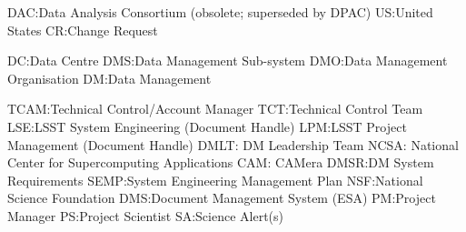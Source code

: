 DAC:Data Analysis Consortium (obsolete; superseded by DPAC)
US:United States
CR:Change Request

DC:Data Centre
DMS:Data Management Sub-system
DMO:Data Management Organisation
DM:Data Management

TCAM:Technical Control/Account Manager
TCT:Technical Control Team
LSE:LSST System Engineering (Document Handle)
LPM:LSST Project Management (Document Handle)
DMLT: DM Leadership Team
NCSA: National Center for Supercomputing Applications
CAM: CAMera
DMSR:DM System Requirements
SEMP:System Engineering Management Plan
NSF:National Science Foundation
DMS:Document Management System (ESA)
PM:Project Manager
PS:Project Scientist
SA:Science Alert(s)

